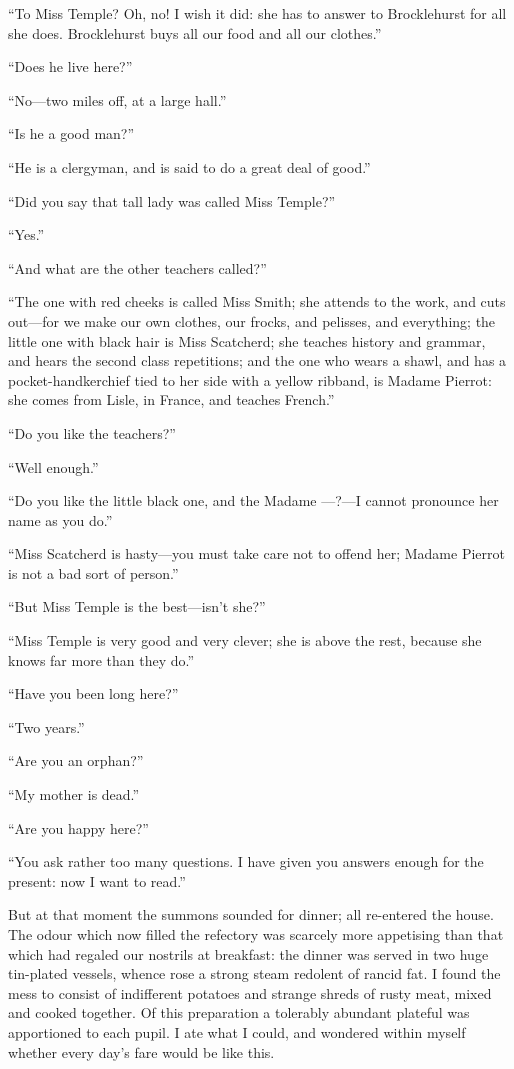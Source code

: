 \enquote{To Miss Temple? Oh, no! I wish it did: she has to answer to
\Mr{} Brocklehurst for all she does. \Mr{} Brocklehurst buys all our food
and all our clothes.}

\enquote{Does he live here?}

\enquote{No---two miles off, at a large hall.}

\enquote{Is he a good man?}

\enquote{He is a clergyman, and is said to do a great deal of good.}

\enquote{Did you say that tall lady was called Miss Temple?}

\enquote{Yes.}

\enquote{And what are the other teachers called?}

\enquote{The one with red cheeks is called Miss Smith; she attends to
the work, and cuts out---for we make our own clothes, our frocks, and
pelisses, and everything; the little one with black hair is Miss
Scatcherd; she teaches history and grammar, and hears the second class
repetitions; and the one who wears a shawl, and has a
pocket-handkerchief tied to her side with a yellow ribband, is Madame
Pierrot: she comes from Lisle, in France, and teaches French.}

\enquote{Do you like the teachers?}

\enquote{Well enough.}

\enquote{Do you like the little black one, and the Madame ---?---I
cannot pronounce her name as you do.}

\enquote{Miss Scatcherd is hasty---you must take care not to offend her;
Madame Pierrot is not a bad sort of person.}

\enquote{But Miss Temple is the best---isn't she?}

\enquote{Miss Temple is very good and very clever; she is above the
rest, because she knows far more than they do.}

\enquote{Have you been long here?}

\enquote{Two years.}

\enquote{Are you an orphan?}

\enquote{My mother is dead.}

\enquote{Are you happy here?}

\enquote{You ask rather too many questions. I have given you answers
enough for the present: now I want to read.}

But at that moment the summons sounded for dinner; all re-entered the
house. The odour which now filled the refectory was scarcely more
appetising than that which had regaled our nostrils at breakfast: the
dinner was served in two huge tin-plated vessels, whence rose a strong
steam redolent of rancid fat. I found the mess to consist of
indifferent potatoes and strange shreds of rusty meat, mixed and cooked
together. Of this preparation a tolerably abundant plateful was
apportioned to each pupil. I ate what I could, and wondered within
myself whether every day's fare would be like this.

